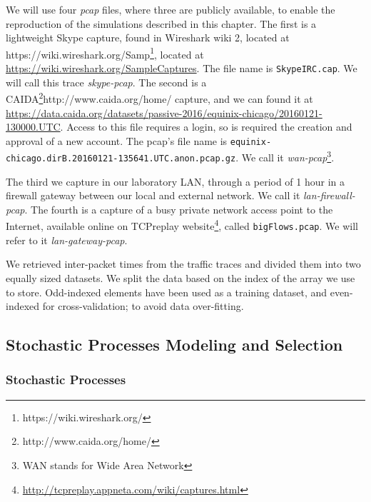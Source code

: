 We will use four \textit{pcap} files, where three are publicly available, to enable the reproduction of the simulations described in this chapter. The first is a lightweight Skype capture, found in Wireshark wiki 2, located at https://wiki.wireshark.org/Samp\footnote{https://wiki.wireshark.org/}, located  at \href{https://wiki.wireshark.org/SampleCaptures}{https://wiki.wireshark.org/SampleCaptures}. The file name is \texttt{SkypeIRC.cap}. We will call this trace \textit{skype-pcap}. The second is a CAIDA\footnote{http://www.caida.org/home/}{http://www.caida.org/home/} capture, and we can found it at \href{https://data.caida.org/datasets/passive-2016/equinix-chicago/20160121-130000.UTC}{https://data.caida.org/datasets/passive-2016/equinix-chicago/20160121-130000.UTC}. Access to this file requires a login, so is required the creation and approval of a new account.  The pcap's file name is \texttt{equinix-chicago.dirB.20160121-135641.UTC.anon.pcap.gz}. We call it \textit{wan-pcap}\footnote{\acrfull{WAN} stands for Wide Area Network}.

The third we capture in our laboratory \acrfull{LAN}, through a period of 1 hour in a firewall gateway between our local and external network. We call it \textit{lan-firewall-pcap}. The fourth is a capture of a busy private network access point to the Internet, available online on TCPreplay website\footnote{ \href{http://tcpreplay.appneta.com/wiki/captures.html}{http://tcpreplay.appneta.com/wiki/captures.html}}, called \texttt{bigFlows.pcap}. We will refer to it \textit{lan-gateway-pcap}.

We retrieved inter-packet times from the traffic traces and divided them into two equally sized datasets. We split the data based on the index of the array we use to store. Odd-indexed elements have been used as a training dataset, and even-indexed for cross-validation; to avoid data over-fitting.


\subsection{Stochastic Processes Modeling and Selection}


\subsubsection{Stochastic Processes}

